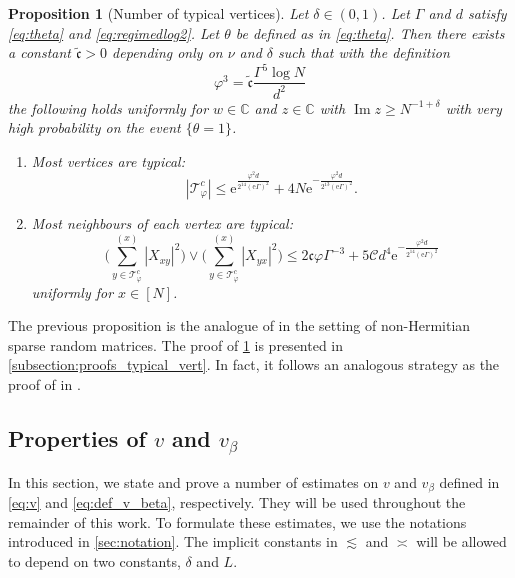 \documentclass[11pt]{article}
\DeclareMathOperator{\Ima}{Im}
\newcommand{\ee}{\mathrm{e}}
\newcommand{\abs}[1]{\left| #1 \right|}
\newcommand{\C}{\mathbb{C}}
\newcommand{\ccc}{\mathfrak{c}}
\renewcommand{\Im}{\Ima}
\theoremstyle{plain}
\newtheorem{prop}{Proposition}[section]
\theoremstyle{remark}
\numberwithin{equation}{section}
\begin{document}
	
	\begin{prop}[Number of typical vertices] \label{prop:mostverticesandneigharetypical}
Let $\delta \in (0,1)$. Let $\Gamma$ and $d$ satisfy \cref{eq:theta} and \eqref{eq:regimedlog2}. Let $\theta$ be defined as in \eqref{eq:theta}. Then there exists a constant $\tilde{\ccc}>0$ depending only on $\nu$ and $\delta$ such that with the definition 
   \begin{equation}\label{eq:new_varphi}
 \varphi^3  = \tilde{\ccc} \frac{\Gamma^5 \log N}{d^2}
		 \end{equation}
  the following holds uniformly for $w \in \C$ and $z \in \C$ with $\Im z \geq N^{-1 + \delta}$  with very high probability on the event $\{\theta =1\}$.
		\begin{enumerate}[label=(\roman*)]
			\item \label{mostverticestypical} Most vertices are typical:
			\begin{equation*}
				\abs{\mathcal{T}_{\varphi}^c} \le \ee^{\frac{\varphi^2d}{2^{14} (\ee\Gamma)^2}}  + 4N \ee^{-\frac{\varphi^2d}{2^{13} (\ee\Gamma)^2}} .
			\end{equation*}
			\item \label{mostneighboursaretypical} Most neighbours of each vertex are typical:
			\begin{equation*}
				\Biggl(\sum_{y\in \mathcal{T}^c_{\varphi}}^{(x)} \abs{X_{xy}}^2\Biggr) \vee \Biggl(\sum_{y\in \mathcal{T}^c_{\varphi}}^{(x)} \abs{X_{yx}}^2 \Biggr)\le 2 \ccc \varphi\Gamma^{-3} + 5\mathcal{C}d^4\ee^{-\frac{\varphi^2d}{2^{14} (\ee\Gamma)^2}}
			\end{equation*}
			uniformly for $x \in [N]$.  
		\end{enumerate}
	\end{prop}

		The previous proposition is the analogue of \cite[Proposition 4.8]{alt2021delocalization} 
		in the setting of non-Hermitian sparse random matrices. The proof of \cref{prop:mostverticesandneigharetypical} is presented in \cref{subsection:proofs_typical_vert}. In fact, it follows an analogous  strategy as the proof of \cite[Proposition~4.8]{alt2021delocalization} in   \cite[Section~4.2]{alt2021delocalization}.
	
	\subsection{Properties of $v$ and $v_\beta$}\label{section:properties_v_v_beta}
	
	In this section, we state and prove a number of estimates on $v$ and $v_\beta$ 
	defined in \cref{eq:v} and \cref{eq:def_v_beta}, respectively. 
	They will be used throughout the remainder of this work. 
	 To formulate these estimates, we use the notations introduced in \cref{sec:notation}.  
	 The implicit constants in $\lesssim$ and $\asymp$ will be allowed to depend on two constants, $\delta$ and $L$.  
	
\end{document}
